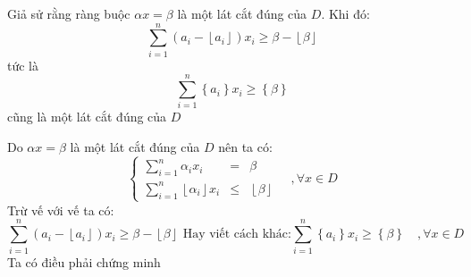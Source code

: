 \documentclass[12pt,a4paper]{article}\author{Nguyễn Nho Dũng}
\newcommand{\taphop}[1]{\left\{#1\right\}}
\newcommand{\ngoacto}[1]{\left(#1\right)}
\newcommand{\tonglanluot}[2]{\sum_{#1}^{#2}}
\newcommand{\phannguyen}[1]{\left\lfloor #1 \right\rfloor}
\begin{document}
\begin{dly}
	Giả sử rằng ràng buộc $\alpha x = \beta$ là một lát cắt đúng của $D$. Khi đó:
	\begin{equation}
		\tonglanluot{i=1}{n} \ngoacto{a_i - \phannguyen{a_i}}x_i \ge \beta - \phannguyen{\beta}
	\end{equation}
	tức là 
	\begin{equation*}
		\tonglanluot{i=1}{n}\taphop{a_i} x_i \ge \taphop{\beta}
	\end{equation*}
	cũng là một lát cắt đúng của $D$
\end{dly}
\begin{cm}
	Do $\alpha x = \beta$ là một lát cắt đúng của $D$ nên ta có:
	\begin{equation}
		\left\{
		\begin{array}{ccc}
			\tonglanluot{i = 1}{n} \alpha_i x_i &=& \beta \\
			\tonglanluot{i = 1}{n} \phannguyen{\alpha_i} x_i &\le& \phannguyen{\beta}
		\end{array}
		\right.\quad, \forall x\in D
	\end{equation}
	Trừ vế với vế ta có:
	\begin{equation}
		\tonglanluot{i=1}{n} \ngoacto{a_i - \phannguyen{a_i}} x_i \ge \beta - \phannguyen{\beta} \text{ Hay viết cách khác:} \tonglanluot{i=1}{n}\taphop{a_i} x_i \ge \taphop{\beta}\quad, \forall x\in D
	\end{equation}
	Ta có điều phải chứng minh
\end{cm}
\end{document}
